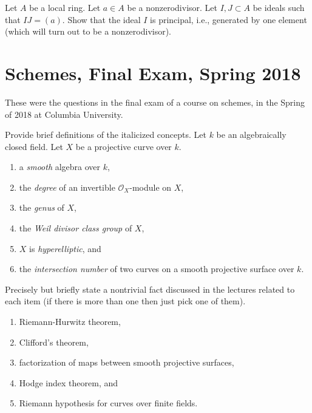 \begin{exercise}
\label{exercise-principal}
Let $A$ be a local ring. Let $a \in A$ be a nonzerodivisor.
Let $I, J \subset A$ be ideals such that $IJ = (a)$. Show that
the ideal $I$ is principal, i.e., generated by one element
(which will turn out to be a nonzerodivisor).
\end{exercise}



\section{Schemes, Final Exam, Spring 2018}
\label{section-final-exam-spring-2018}

\noindent
These were the questions in the final exam of a course on schemes,
in the Spring of 2018 at Columbia University.

\begin{exercise}[Definitions]
\label{exercise-definitions-spring-2018}
Provide brief definitions of the italicized concepts.
Let $k$ be an algebraically closed field.
Let $X$ be a projective curve over $k$.
\begin{enumerate}
\item a {\it smooth} algebra over $k$,
\item the {\it degree} of an invertible $\mathcal{O}_X$-module on $X$,
\item the {\it genus} of $X$,
\item the {\it Weil divisor class group} of $X$,
\item $X$ is {\it hyperelliptic}, and
\item the {\it intersection number}
of two curves on a smooth projective surface over $k$.
\end{enumerate}
\end{exercise}

\begin{exercise}[Theorems]
\label{exercise-results-spring-2018}
Precisely but briefly state a nontrivial fact discussed in the lectures
related to each item (if there is more than one then just pick
one of them).
\begin{enumerate}
\item Riemann-Hurwitz theorem,
\item Clifford's theorem,
\item factorization of maps between smooth projective surfaces,
\item Hodge index theorem, and
\item Riemann hypothesis for curves over finite fields.
\end{enumerate}
\end{exercise}


